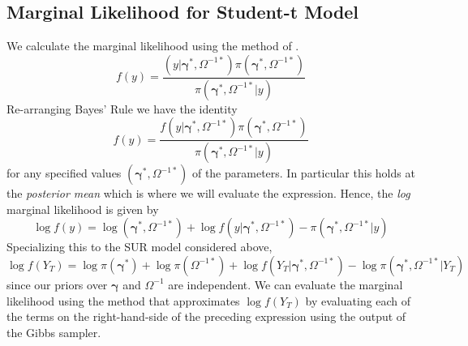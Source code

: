 \documentclass[12pt]{article}
\begin{document}
\subsection{Marginal Likelihood for Student-t Model}
 We calculate the marginal likelihood using the method of \cite{chib1995marginal}.
 \begin{equation*}
 f(y) = \frac{(y|\boldsymbol{\gamma}^*,\Omega^{-1*})\pi\left(\boldsymbol{\gamma}^*, \Omega^{-1*}\right)}{\pi\left(\boldsymbol{\gamma}^*, \Omega^{-1*}|y \right)}
 \end{equation*} 
Re-arranging Bayes' Rule we have the identity
\begin{equation*}
f(y) = \frac{f(y|\boldsymbol{\gamma}^*,\Omega^{-1*})\pi\left(\boldsymbol{\gamma}^*, \Omega^{-1*}\right)}{\pi\left(\boldsymbol{\gamma}^*, \Omega^{-1*}|y \right)}
\end{equation*}
for any specified values $(\boldsymbol{\gamma}^*,\Omega^{-1*})$ of the parameters.
In particular this holds at the \emph{posterior mean} which is where we will evaluate the expression.
Hence, the \emph{log} marginal likelihood is given by
\begin{equation*}
\log{f(y)} =  \log \left(\boldsymbol{\gamma}^*, \Omega^{-1*}\right) + \log{f(y|\boldsymbol{\gamma}^*,\Omega^{-1*})} - \pi\left(\boldsymbol{\gamma}^*, \Omega^{-1*}|y \right)
\end{equation*}
Specializing this to the SUR model considered above,
\begin{equation*}
\log f(Y_T) = \log \pi(\boldsymbol{\gamma}^*) + \log \pi\left( \Omega^{-1*} \right) + \log f\left( Y_T|\boldsymbol{\gamma}^*, \Omega^{-1*} \right) - \log \pi\left( \boldsymbol{\gamma}^*, \Omega^{-1*}|Y_T \right)
\end{equation*}
since our priors over $\boldsymbol{\gamma}$ and $\Omega^{-1}$ are independent. We can evaluate the marginal likelihood using the \cite{chib1995marginal} method that approximates $\log f(Y_T)$ by evaluating each of the terms on the right-hand-side of the preceding expression using the output of the Gibbs sampler.
\end{document}
